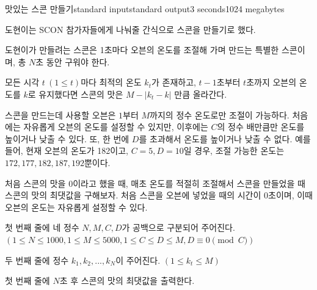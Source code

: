 \begin{problem}{맛있는 스콘 만들기}{standard input}{standard output}{3 seconds}{1024 megabytes}

도현이는 SCON 참가자들에게 나눠줄 간식으로 스콘을 만들기로 했다.  

도현이가 만들려는 스콘은 1초마다 오븐의 온도를 조절해 가며 만드는 특별한 스콘이며, 총 $N$초 동안 구워야 한다.  

모든 시각 $t \ (1 \leq t)$마다 최적의 온도 $k_t$가 존재하고, $t-1$초부터 $t$초까지 오븐의 온도를 $k$로 유지했다면 스콘의 맛은 $M - |k_t - k|$ 만큼 올라간다.  

스콘을 만드는데 사용할 오븐은 $1$부터 $M$까지의 정수 온도로만 조절이 가능하다.  
처음에는 자유롭게 오븐의 온도를 설정할 수 있지만, 이후에는 $C$의 정수 배만큼만 온도를 높이거나 낮출 수 있다. 또, 한 번에 $D$를 초과해서 온도를 높이거나 낮출 수 없다. 예를 들어, 현재 오븐의 온도가 182이고, $C=5, D=10$일 경우, 조절 가능한 온도는 $172, 177, 182, 187, 192$뿐이다.  

처음 스콘의 맛을 $0$이라고 했을 때, 매초 온도를 적절히 조절해서 스콘을 만들었을 때 스콘의 맛의 최댓값을 구해보자. 처음 스콘을 오븐에 넣었을 때의 시간이 $0$초이며, 이때 오븐의 온도는 자유롭게 설정할 수 있다.  

\InputFile
첫 번째 줄에 네 정수 $N, M, C, D$가 공백으로 구분되어 주어진다. $(1 \leq N \leq 1000, 1 \leq M \leq 5000, 1 \leq C \leq D \leq M, D \equiv 0 \pmod{C})$

두 번째 줄에 정수 $k_1, k_2, ... , k_N$이 주어진다. $(1 \leq k_t \leq M)$


\OutputFile
첫 번째 줄에 $N$초 후 스콘의 맛의 최댓값을 출력한다.

\Examples

\begin{example}
%
%
\end{example}

\end{problem}


